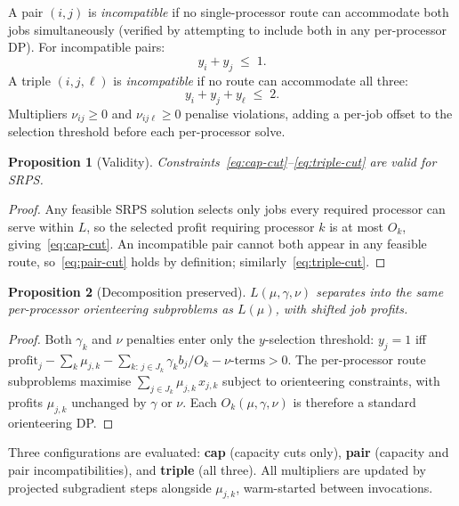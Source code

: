 \documentclass[11pt,a4paper]{article}
\newtheorem{proposition}{Proposition}
\begin{document}
A pair $(i,j)$ is \emph{incompatible} if no single-processor route can accommodate
both jobs simultaneously (verified by attempting to include both in any per-processor
DP).  For incompatible pairs:
\begin{equation}\label{eq:pair-cut}
  y_i + y_j \;\le\; 1.
\end{equation}
A triple $(i,j,\ell)$ is \emph{incompatible} if no route can accommodate all three:
\begin{equation}\label{eq:triple-cut}
  y_i + y_j + y_\ell \;\le\; 2.
\end{equation}
Multipliers $\nu_{ij}\ge 0$ and $\nu_{ij\ell}\ge 0$ penalise violations, adding a
per-job offset to the selection threshold before each per-processor solve.

\begin{proposition}[Validity]\label{prop:cuts-valid}
Constraints~\eqref{eq:cap-cut}--\eqref{eq:triple-cut} are valid for SRPS.
\end{proposition}
\begin{proof}
Any feasible SRPS solution selects only jobs every required processor can serve
within $L$, so the selected profit requiring processor $k$ is at most $O_k$,
giving~\eqref{eq:cap-cut}. An incompatible pair cannot both appear in any
feasible route, so~\eqref{eq:pair-cut} holds by definition;
similarly~\eqref{eq:triple-cut}.
\end{proof}

\begin{proposition}[Decomposition preserved]\label{prop:decomp}
$L(\mu,\gamma,\nu)$ separates into the same per-processor orienteering subproblems
as $L(\mu)$, with shifted job profits.
\end{proposition}
\begin{proof}
Both $\gamma_k$ and $\nu$ penalties enter only the $y$-selection threshold:
$y_j=1$ iff $\mathrm{profit}_j - \sum_k\mu_{j,k}
- \sum_{k:\,j\in J_k}\gamma_k b_j/O_k - \nu\text{-terms} > 0$.
The per-processor route subproblems maximise $\sum_{j\in J_k}\mu_{j,k}\,x_{j,k}$
subject to orienteering constraints, with profits $\mu_{j,k}$ unchanged by
$\gamma$ or $\nu$.  Each $O_k(\mu,\gamma,\nu)$ is therefore a standard
orienteering DP.
\end{proof}

Three configurations are evaluated: \textbf{cap} (capacity cuts only),
\textbf{pair} (capacity and pair incompatibilities), and
\textbf{triple} (all three).  All multipliers are updated by projected
subgradient steps alongside $\mu_{j,k}$, warm-started between invocations.
\end{document}
